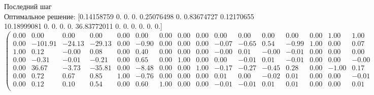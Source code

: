 \documentclass[draft]{article}
\begin{document}
\begin{flushleft}
    Последний шаг \\
    Оптимальное решение:
    [0.14158759  0.  0.  0.  0.25076498  0.  0.83674727  0.12170655  10.18999081  0.  0.  0.  0.  36.83772011  0.  0.  0.  0.  0.  0.]
\begin{equation*}
\begin{pmatrix}
    0.00 &    0.00 &   0.00 &   0.00 & 0.00 &  0.00 & 0.00 & 0.00 & 0.00 &  0.00 &  0.00 &  0.00 &  0.00 & 0.00 &  1.00 &  1.00 &  1.00 &  1.00 &  1.00 &  1.00 & -0.00 \\
    0.00 & -101.91 & -24.13 & -29.13 & 0.00 & -0.90 & 0.00 & 0.00 & 0.00 & -0.07 & -0.65 &  0.54 & -0.99 & 1.00 &  0.00 &  0.07 &  0.65 & -0.54 &  0.99 & -1.00 & 36.84 \\
    1.00 &    0.12 &  -0.00 &   0.08 & 0.00 &  0.40 & 0.00 & 0.00 & 0.00 & -0.00 &  0.01 & -0.00 & -0.01 & 0.00 &  0.00 &  0.00 & -0.01 &  0.00 &  0.01 &  0.00 &  0.14 \\
    0.00 &   -0.31 &  -0.01 &  -0.21 & 0.00 &  0.65 & 0.00 & 1.00 & 0.00 &  0.00 & -0.01 &  0.01 & -0.01 & 0.00 &  0.00 & -0.00 &  0.01 & -0.01 &  0.01 &  0.00 &  0.12 \\
    0.00 &   36.67 &  -3.73 & -35.81 & 0.00 & -8.48 & 0.00 & 0.00 & 1.00 & -0.17 & -0.27 & -0.45 &  0.28 & 0.00 & -1.00 &  0.17 &  0.27 &  0.45 & -0.28 &  0.00 & 10.19 \\
    0.00 &    0.72 &   0.67 &   0.85 & 1.00 & -0.76 & 0.00 & 0.00 & 0.00 &  0.01 &  0.00 & -0.02 &  0.01 & 0.00 &  0.00 & -0.01 & -0.00 &  0.02 & -0.01 &  0.00 &  0.25 \\
    0.00 &    0.12 &   0.10 &   0.54 & 0.00 &  0.60 & 1.00 & 0.00 & 0.00 & -0.01 & -0.01 &  0.01 &  0.01 & 0.00 &  0.00 &  0.01 &  0.01 & -0.01 & -0.01 &  0.00 &  0.84 \\
\end{pmatrix}
\end{equation*}
\end{flushleft}
\end{document}
